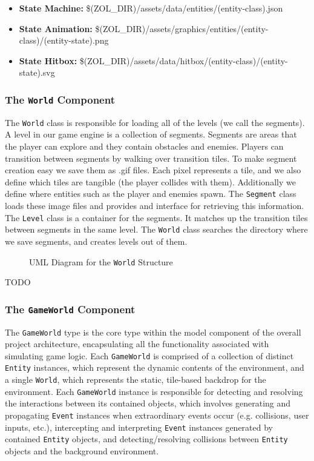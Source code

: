 \documentclass{article}
\newcommand{\classname}[1] {\texttt{#1}}
\newcommand{\insertdiagram}[2]
{
	\begin{figure}[H]
		\centering
		\fbox{\texttt{[image: figures/\#1]}}
		\caption{UML Diagram for the \classname{#1} Structure}
	\end{figure}
}
\begin{document}
			\begin{itemize}
				\item \textbf{State Machine:} \$(ZOL\_DIR)/assets/data/entities/(entity-class).json
				\item \textbf{State Animation:} \$(ZOL\_DIR)/assets/graphics/entities/(entity-class)/(entity-state).png
				\item \textbf{State Hitbox:} \$(ZOL\_DIR)/assets/data/hitbox/(entity-class)/(entity-state).svg
			\end{itemize}

			\subsubsection[\classname{World}]{The \classname{World} Component}
			The \classname{World} class is responsible for loading all of the levels (we call the segments). 
			A level in our game engine is a collection of segments. Segments are areas that the 
			player can explore and they contain obstacles and enemies. Players can transition between 
			segments by walking over transition tiles. To make segment creation easy we save them as 
			.gif files. Each pixel represents a tile, and we also define which tiles are tangible 
			(the player collides with them). Additionally we define where entities such as the player 
			and enemies spawn. The \classname{Segment} class loads these image files and provides and interface 
			for retrieving this information. The \classname{Level} class is a container for the segments. It matches 
			up the transition tiles between segments in the same level. The \classname{World} class searches the 
			directory where we save segments, and creates levels out of them.

			\insertdiagram{World}{2.0in}

			TODO

			\subsubsection[\classname{GameWorld}]{The \classname{GameWorld} Component}
			The \classname{GameWorld} type is the core type within the model
			component of the overall project architecture, encapsulating all
			the functionality associated with simulating game logic.  Each
			\classname{GameWorld} is comprised of a collection of distinct
			\classname{Entity} instances, which represent the dynamic contents
			of the environment, and a single \classname{World}, which represents
			the static, tile-based backdrop for the environment.  Each \classname{GameWorld} instance
			is responsible for detecting and resolving the interactions between
			its contained objects, which involves generating and propagating
			\classname{Event} instances when extraordinary events occur (e.g.
			collisions, user inputs, etc.), intercepting and interpreting
			\classname{Event} instances generated by contained \classname{Entity}
			objects, and detecting/resolving collisions between \classname{Entity}
			objects and the background environment.
\end{document}
